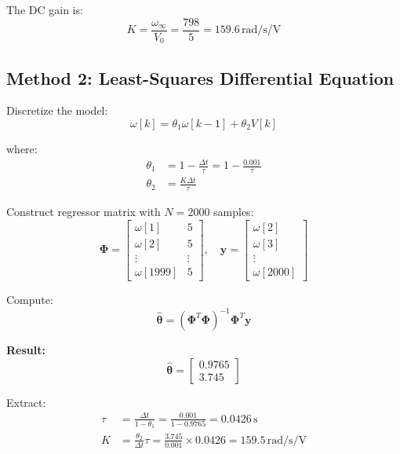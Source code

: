 The DC gain is:
\begin{equation}
K = \frac{\omega_{\infty}}{V_0} = \frac{798}{5} = 159.6 \, \text{rad/s/V}
\end{equation}

\subsection{Method 2: Least-Squares Differential Equation}

Discretize the model:
\begin{equation}
\omega[k] = \theta_1 \omega[k-1] + \theta_2 V[k]
\end{equation}

where:
\begin{align}
\theta_1 &= 1 - \frac{\Delta t}{\tau} = 1 - \frac{0.001}{\tau} \\
\theta_2 &= \frac{K\Delta t}{\tau}
\end{align}

Construct regressor matrix with $N = 2000$ samples:
\begin{equation}
\mathbf{\Phi} = \begin{bmatrix}
\omega[1] & 5 \\
\omega[2] & 5 \\
\vdots & \vdots \\
\omega[1999] & 5
\end{bmatrix}, \quad
\mathbf{y} = \begin{bmatrix}
\omega[2] \\
\omega[3] \\
\vdots \\
\omega[2000]
\end{bmatrix}
\end{equation}

Compute:
\begin{equation}
\hat{\boldsymbol{\theta}} = (\mathbf{\Phi}^T\mathbf{\Phi})^{-1}\mathbf{\Phi}^T\mathbf{y}
\end{equation}

\textbf{Result:}
\begin{equation}
\hat{\boldsymbol{\theta}} = \begin{bmatrix} 0.9765 \\ 3.745 \end{bmatrix}
\end{equation}

Extract:
\begin{align}
\tau &= \frac{\Delta t}{1 - \theta_1} = \frac{0.001}{1 - 0.9765} = 0.0426 \, \text{s} \\
K &= \frac{\theta_2}{\Delta t} \tau = \frac{3.745}{0.001} \times 0.0426 = 159.5 \, \text{rad/s/V}
\end{align}


